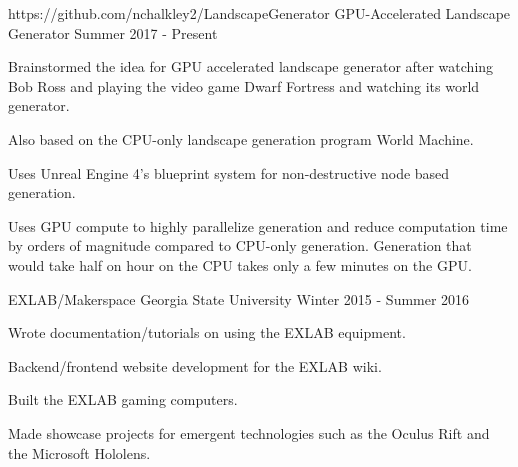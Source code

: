 

\begin{cventries}

  \cventry
    {https://github.com/nchalkley2/LandscapeGenerator} %
	{GPU-Accelerated Landscape Generator} %
    {} %
    {Summer 2017 - Present} %
    {
      \begin{cvitems} %
        \item {Brainstormed the idea for GPU accelerated landscape generator after watching Bob Ross and playing the video game Dwarf Fortress and watching its world generator.}
        \item {Also based on the CPU-only landscape generation program World Machine.}
		\item {Uses Unreal Engine 4's blueprint system for non-destructive node based generation.}
		\item {Uses GPU compute to highly parallelize generation and reduce computation time by orders of magnitude compared to CPU-only generation. Generation that would take half on hour on the CPU takes only a few minutes on the GPU.}
      \end{cvitems}
    }

  \cventry
    {} %
	{EXLAB/Makerspace} %
    {Georgia State University} %
    {Winter 2015 - Summer 2016} %
    {
      \begin{cvitems} %
        \item {Wrote documentation/tutorials on using the EXLAB equipment.}
        \item {Backend/frontend website development for the EXLAB wiki.}
		\item {Built the EXLAB gaming computers.}
		\item {Made showcase projects for emergent technologies such as the Oculus Rift and the Microsoft Hololens.}
      \end{cvitems}
    }


\end{cventries}
